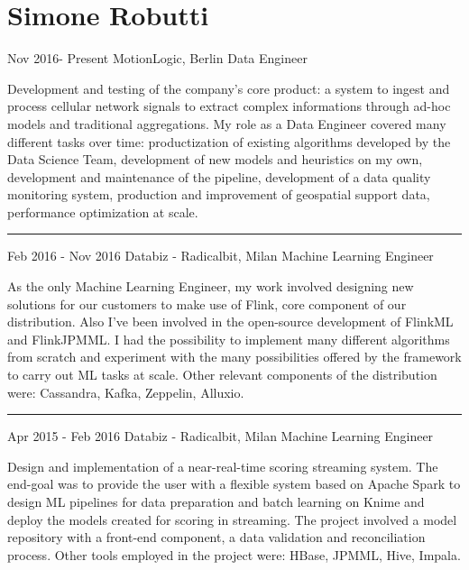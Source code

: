 \documentclass{tccv}
\begin{document}
\part{Simone Robutti}

\begin{eventlist}

\item{Nov 2016- Present}
     {MotionLogic, Berlin}
     {Data Engineer}

Development and testing of the company's core product: a system to ingest and process cellular network signals to extract complex informations through ad-hoc models and traditional aggregations. My role as a Data Engineer covered many different tasks over time: productization of existing algorithms developed by the Data Science Team, development of new models and heuristics on my own, development and maintenance of the pipeline, development of a data quality monitoring system, production and improvement of geospatial support data, performance optimization at scale.


\noindent\hfil\rule{0.3\textwidth}{.4pt}

\item{Feb 2016 - Nov 2016}
{Databiz - Radicalbit, Milan}
{Machine Learning Engineer}

As the only Machine Learning Engineer, my work involved designing new solutions for our customers to make use of Flink, core component of our distribution. Also I've been involved in the open-source development of FlinkML and FlinkJPMML. I had the possibility to implement many different algorithms from scratch and experiment with the many possibilities offered by the framework to carry out ML tasks at scale. Other relevant components of the distribution were: Cassandra, Kafka, Zeppelin, Alluxio.

\noindent\hfil\rule{0.3\textwidth}{.4pt}

\item{Apr 2015 - Feb 2016}
{Databiz - Radicalbit, Milan}
{Machine Learning Engineer}

Design and implementation of a near-real-time scoring streaming system. The end-goal was to provide the user with a flexible system based on Apache Spark to design ML pipelines for data preparation and batch learning on Knime and deploy the models created for scoring in streaming. The project involved a model repository with a front-end component, a data validation and reconciliation process. Other tools employed in the project were: HBase, JPMML, Hive, Impala.

\end{eventlist}
\end{document}
